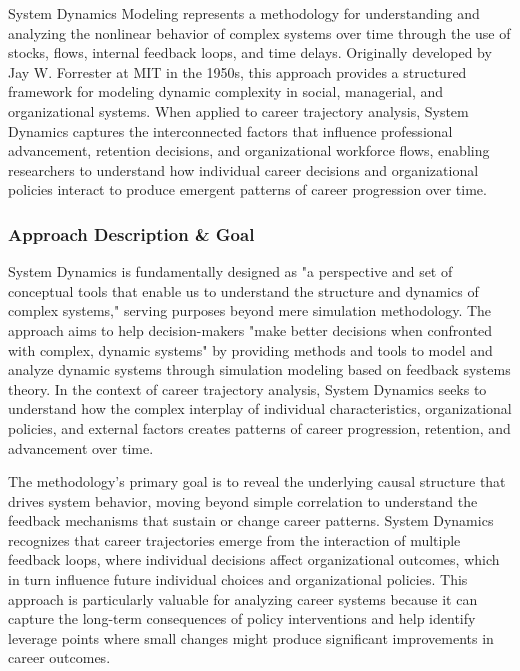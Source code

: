 \documentclass[main.tex]{subfiles}
\begin{document}
System Dynamics Modeling represents a methodology for understanding and analyzing the nonlinear behavior of complex systems over time through the use of stocks, flows, internal feedback loops, and time delays\parencite{systemdynamics_org,sd_wikipedia}. Originally developed by Jay W. Forrester at MIT in the 1950s, this approach provides a structured framework for modeling dynamic complexity in social, managerial, and organizational systems\parencite{forrester_origin,sd_wikipedia}. When applied to career trajectory analysis, System Dynamics captures the interconnected factors that influence professional advancement, retention decisions, and organizational workforce flows, enabling researchers to understand how individual career decisions and organizational policies interact to produce emergent patterns of career progression over time\parencite{ibm_workforce,dulce_thesis}.

\subsubsection{Approach Description \& Goal}

System Dynamics is fundamentally designed as "a perspective and set of conceptual tools that enable us to understand the structure and dynamics of complex systems," serving purposes beyond mere simulation methodology\parencite{sterman_review}. The approach aims to help decision-makers "make better decisions when confronted with complex, dynamic systems" by providing methods and tools to model and analyze dynamic systems through simulation modeling based on feedback systems theory\parencite{systemdynamics_org}. In the context of career trajectory analysis, System Dynamics seeks to understand how the complex interplay of individual characteristics, organizational policies, and external factors creates patterns of career progression, retention, and advancement over time.

The methodology's primary goal is to reveal the underlying causal structure that drives system behavior, moving beyond simple correlation to understand the feedback mechanisms that sustain or change career patterns\parencite{sterman_tools}. System Dynamics recognizes that career trajectories emerge from the interaction of multiple feedback loops, where individual decisions affect organizational outcomes, which in turn influence future individual choices and organizational policies\parencite{sd_wikipedia}. This approach is particularly valuable for analyzing career systems because it can capture the long-term consequences of policy interventions and help identify leverage points where small changes might produce significant improvements in career outcomes.
\end{document}
